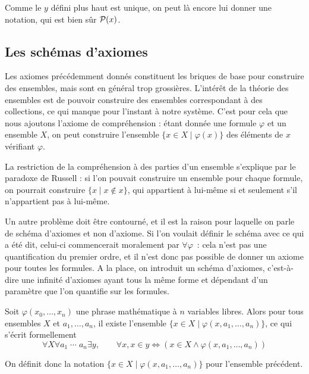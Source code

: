 \begin{notation}
  Comme le $y$ défini plus haut est unique, on peut là encore lui donner une
  notation, qui est bien sûr $\mathcal{P}(x)$.
\end{notation}

\subsection{Les schémas d'axiomes}

Les axiomes précédemment donnés constituent les briques de base pour construire
des ensembles, mais sont en général trop grossières. L'intérêt de la théorie des
ensembles est de pouvoir construire des ensembles correspondant à des
collections, ce qui manque pour l'instant à notre système. C'est pour cela que
nous ajoutons l'axiome de compréhension : étant donnée une formule $\varphi$ et
un ensemble $X$, on peut construire l'ensemble $\{x \in X\mid \varphi(x)\}$ des
éléments de $x$ vérifiant $\varphi$.

La restriction de la compréhension à des parties d'un ensemble s'explique par le
paradoxe de Russell : si l'on pouvait construire un ensemble pour chaque
formule, on pourrait construire $\{ x \mid x\notin x\}$, qui appartient à
lui-même si et seulement s'il n'appartient pas à lui-même.

Un autre problème doit être contourné, et il est la raison pour laquelle on
parle de schéma d'axiomes et non d'axiome. Si l'on voulait définir le schéma
avec ce qui a été dit, celui-ci commencerait moralement par $\forall \varphi$~:
cela n'est pas une quantification du premier ordre, et il n'est donc pas
possible de donner un axiome pour toutes les formules. A la place, on introduit
un schéma d'axiomes, c'est-à-dire une infinité d'axiomes ayant tous la même
forme et dépendant d'un paramètre que l'on quantifie sur les formules.

\begin{axiom}
  Soit $\varphi(x_0,\ldots,x_n)$ une phrase mathématique à $n$ variables libres.
  Alors pour tous ensembles $X$ et $a_1,\ldots,a_n$, il existe l'ensemble
  $\{x\in X \mid \varphi(x,a_1,\ldots,a_n)\}$, ce qui s'écrit formellement
  \[\forall X\forall a_1\;\cdots\;a_n\exists y,\qquad
    \forall x, x \in y \iff (x\in X\land \varphi(x,a_1,\ldots,a_n))\]
\end{axiom}

\begin{notation}
  On définit donc la notation $\{x\in X\mid \varphi(x,a_1,\ldots,a_n)\}$ pour
  l'ensemble précédent.
\end{notation}

